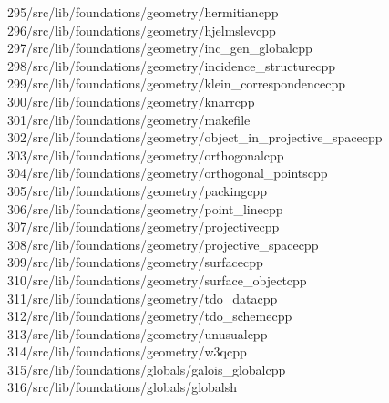 \begin{tabbing}
295\>/src/lib/foundations/geometry/hermitiancpp\\[0pt]
296\>/src/lib/foundations/geometry/hjelmslevcpp\\[0pt]
297\>/src/lib/foundations/geometry/inc\_gen\_globalcpp\\[0pt]
298\>/src/lib/foundations/geometry/incidence\_structurecpp\\[0pt]
299\>/src/lib/foundations/geometry/klein\_correspondencecpp\\[0pt]
300\>/src/lib/foundations/geometry/knarrcpp\\[0pt]
301\>/src/lib/foundations/geometry/makefile\\[0pt]
302\>/src/lib/foundations/geometry/object\_in\_projective\_spacecpp\\[0pt]
303\>/src/lib/foundations/geometry/orthogonalcpp\\[0pt]
304\>/src/lib/foundations/geometry/orthogonal\_pointscpp\\[0pt]
305\>/src/lib/foundations/geometry/packingcpp\\[0pt]
306\>/src/lib/foundations/geometry/point\_linecpp\\[0pt]
307\>/src/lib/foundations/geometry/projectivecpp\\[0pt]
308\>/src/lib/foundations/geometry/projective\_spacecpp\\[0pt]
309\>/src/lib/foundations/geometry/surfacecpp\\[0pt]
310\>/src/lib/foundations/geometry/surface\_objectcpp\\[0pt]
311\>/src/lib/foundations/geometry/tdo\_datacpp\\[0pt]
312\>/src/lib/foundations/geometry/tdo\_schemecpp\\[0pt]
313\>/src/lib/foundations/geometry/unusualcpp\\[0pt]
314\>/src/lib/foundations/geometry/w3qcpp\\[0pt]
315\>/src/lib/foundations/globals/galois\_globalcpp\\[0pt]
316\>/src/lib/foundations/globals/globalsh\\[0pt]

\end{tabbing}
